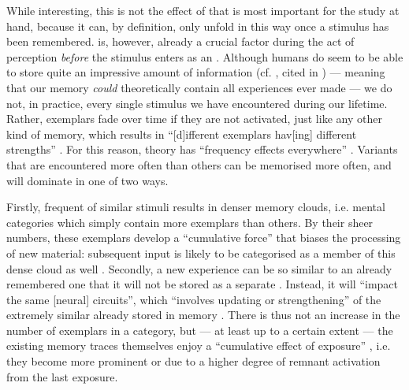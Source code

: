 While interesting, this is not the effect of  that is most important for the study at hand, because it can, by definition, only unfold in this way once a stimulus has been remembered.
 is, however, already a crucial factor during the act of perception \emph{before} the stimulus enters  as an .
Although humans do seem to be able to store quite an impressive amount of information (cf. \citealt{johnson2005}, cited in \citealt[44]{racz2013}) --- meaning that our memory \emph{could} theoretically contain all experiences ever made --- we do not, in practice,  every single stimulus we have encountered during our lifetime.
Rather, exemplars fade over time if they are not activated, just like any other kind of memory, which results in ``[d]ifferent exemplars hav[ing] different strengths'' \parencite[cf.][115]{pierrehumbert2002}.
For this reason,  theory has ``frequency effects everywhere'' \parencite[524]{pierrehumbert2006}.
Variants that are encountered more often than others can be memorised more often, and will dominate  in one of two ways.

Firstly, frequent  of similar stimuli results in denser memory clouds, i.e. mental categories which simply contain more exemplars than others.
By their sheer numbers, these exemplars develop a ``cumulative force'' that biases the processing of new material: subsequent input is likely to be categorised as a member of this dense cloud as well \parencite[cf.][524]{pierrehumbert2006}.
Secondly, a new experience can be so similar to an already remembered one that it will not be stored as a separate .
Instead, it will ``impact the same [neural] circuits'', which ``involves updating or strengthening'' of the extremely similar  already stored in memory \parencite[525]{pierrehumbert2006}.
There is thus not an increase in the number of exemplars in a category, but --- at least up to a certain extent --- the existing memory traces themselves enjoy a ``cumulative effect of exposure'' \parencite[525]{pierrehumbert2006}, i.e. they become more prominent or  due to a higher degree of remnant activation from the last exposure.

